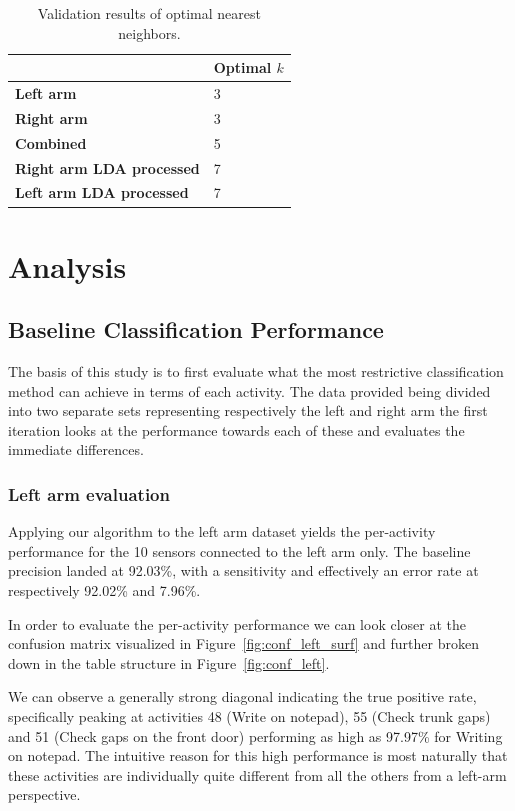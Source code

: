 \documentclass{sig-alternate}
\begin{document}
\begin{table}[bp]
\centering
\caption{Validation results of optimal nearest neighbors.}
\begin{tabular}{|l|l|}
\hline
           			&\textbf{Optimal $k$} 	\\ \hline
\textbf{Left arm}  						& 3 		 				\\ \hline
\textbf{Right arm} 						& 3		 					\\ \hline
\textbf{Combined}  						& 5 						\\ \hline
\textbf{Right arm LDA processed} 		& 7 						\\ \hline
\textbf{Left arm LDA processed} 		& 7 						\\ \hline

\end{tabular}
\label{tab:optimal_k}
\end{table}


\section{Analysis}
\subsection{Baseline Classification Performance}
The basis of this study is to first evaluate what the most restrictive classification method can achieve in terms of each activity. The data provided being divided into two separate sets representing respectively the left and right arm the first iteration looks at the performance towards each of these and evaluates the immediate differences.

\subsubsection{Left arm evaluation}
Applying our algorithm to the left arm dataset yields the per-activity performance for the 10 sensors connected to the left arm only. The baseline precision landed at 92.03\%, with a sensitivity and effectively an error rate at respectively 92.02\% and 7.96\%. 

In order to evaluate the per-activity performance we can look closer at the confusion matrix visualized in Figure~\ref{fig:conf_left_surf} and further broken down in the table structure in Figure~\ref{fig:conf_left}.

We can observe a generally strong diagonal indicating the true positive rate, specifically peaking at activities 48 (Write on notepad), 55 (Check trunk gaps)  and 51 (Check gaps on the front door) performing as high as 97.97\% for Writing on notepad. The intuitive reason for this high performance is most naturally that these activities are individually quite different from all the others from a left-arm perspective. 
\end{document}
